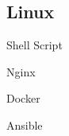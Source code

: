 \documentclass[]{deedy-resume-openfont-ch}
\begin{document}
\begin{minipage}[t]{0.5\textwidth}
\vspace{\topsep}
\begin{minipage}[t]{0.45\textwidth}
    \subsection{Linux}
    \vspace{\topsep}
    \begin{tightemize}
        \item Shell Script
        \item Nginx
        \item Docker
        \item Ansible
    \end{tightemize}
\end{minipage}

\end{minipage}
\end{document}
